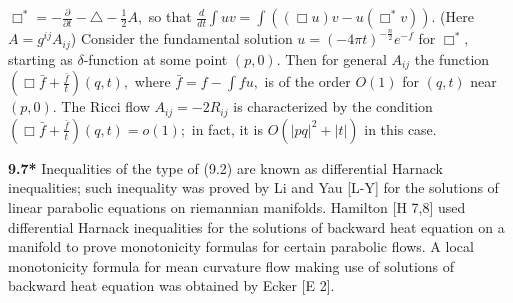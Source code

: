 \documentclass[12pt]{article}
\theoremstyle{plain}
{\swapnumbers
\newtheorem{thm}{Theorem}[section]
\newtheorem{cor}[thm]{Corollary}
\newtheorem{lem}[thm]{Lemma}
\newtheorem{prop}[thm]{Proposition}
}
\theoremstyle{definition}
{\swapnumbers
\newtheorem{defn}[thm]{Definition}
\newtheorem{nota}[thm]{Notation}
\newtheorem{parag}[thm]{}
\newtheorem*{parstr}{\addtocounter{thm}{1}\thesection.\arabic{thm}*}
\newtheorem*{intropar}{\addtocounter{thm}{1}\arabic{thm}}
}
\theoremstyle{remark} {\swapnumbers
\newtheorem{rem}[thm]{Remark}
\newtheorem{exam}[thm]{Example}
\newtheorem{lemma}[thm]{Lemma}
\newtheorem{claim}[thm]{Claim}
}
\numberwithin{equation}{section}
\begin{document}
 $\Box^*=-\frac{\partial}{\partial t}-\triangle-\frac{1}{2}A,$ so
 that $\frac{d}{dt}\int{uv}=\int{((\Box u)v-u(\Box^* v))}.$
 (Here $A=g^{ij}A_{ij}$) Consider the fundamental solution
 $u=(-4\pi t)^{-\frac{n}{2}}e^{-f}$ for $\Box^*,$ starting as
 $\delta$-function at some point $(p,0).$ Then for general $A_{ij}$
 the function $(\Box\bar{ f}+\frac{\bar{f}}{t})(q,t),$ where $\bar{f}=f-\int{fu},$ is of the order
 $O(1)$ for $(q,t)$ near $(p,0).$ The Ricci flow $A_{ij}=-2R_{ij}$ is
 characterized by the condition $(\Box\bar{
 f}+\frac{\bar{f}}{t})(q,t)=o(1);$ in fact, it is
 $O(|pq|^2+|t|)$ in this case.\par {\bf 9.7*}
 Inequalities of the type of (9.2) are known as
 differential Harnack inequalities; such inequality was proved by Li and Yau [L-Y]
  for the solutions of linear parabolic equations on riemannian manifolds. Hamilton [H 7,8] used
   differential Harnack inequalities for the solutions of backward heat equation on
   a manifold to prove monotonicity formulas for certain parabolic flows. A
  local
  monotonicity formula for mean curvature flow making use of
  solutions of backward heat equation was obtained by Ecker [E 2].
\end{document}
